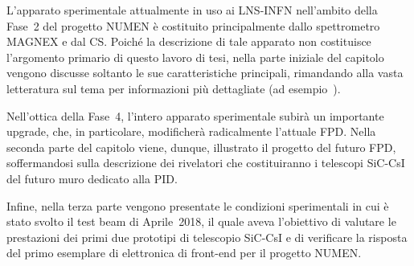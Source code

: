 

L'apparato sperimentale attualmente in uso ai LNS-INFN nell'ambito della Fase~2 del progetto NUMEN è costituito principalmente dallo spettrometro MAGNEX e dal CS.
Poiché la descrizione di tale apparato non costituisce l'argomento primario di questo lavoro di tesi, nella parte iniziale del capitolo vengono discusse soltanto le sue caratteristiche principali, rimandando alla vasta letteratura sul tema per informazioni più dettagliate (ad esempio~\cite{cavallaro:epja12, carbone:epja12, cappuzzello:epja16, cunsolo:epjst07}).

Nell'ottica della Fase~4, l'intero apparato sperimentale subirà un importante upgrade, che, in particolare, modificherà radicalmente l'attuale FPD.
Nella seconda parte del capitolo viene, dunque, illustrato il progetto del futuro FPD, soffermandosi sulla descrizione dei rivelatori che costituiranno i telescopi SiC-CsI del futuro muro dedicato alla PID.


Infine, nella terza parte vengono presentate le condizioni sperimentali in cui è stato svolto il test beam di Aprile~2018, il quale aveva l'obiettivo di valutare le prestazioni dei primi due prototipi di telescopio SiC-CsI e di verificare la risposta del primo esemplare di elettronica di front-end per il progetto NUMEN.



\section{}

